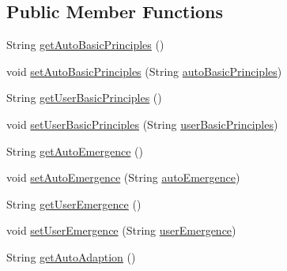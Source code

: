 \subsection*{Public Member Functions}
\begin{DoxyCompactItemize}
\item 
String \hyperlink{classit_1_1isislab_1_1masonassisteddocumentation_1_1_o_d_d_1_1_design_concepts_ad75bf46cbf179f05163ee5910a8266f4}{get\-Auto\-Basic\-Principles} ()
\item 
void \hyperlink{classit_1_1isislab_1_1masonassisteddocumentation_1_1_o_d_d_1_1_design_concepts_a2ad4783ae2e791424ebc7760db127522}{set\-Auto\-Basic\-Principles} (String \hyperlink{classit_1_1isislab_1_1masonassisteddocumentation_1_1_o_d_d_1_1_design_concepts_a79342d4cc10a83a36362ddb68ba842ad}{auto\-Basic\-Principles})
\item 
String \hyperlink{classit_1_1isislab_1_1masonassisteddocumentation_1_1_o_d_d_1_1_design_concepts_ae659768d4ca7393a7c12437782cdfb08}{get\-User\-Basic\-Principles} ()
\item 
void \hyperlink{classit_1_1isislab_1_1masonassisteddocumentation_1_1_o_d_d_1_1_design_concepts_a43bedaee069c906fde6e2cf4eac55910}{set\-User\-Basic\-Principles} (String \hyperlink{classit_1_1isislab_1_1masonassisteddocumentation_1_1_o_d_d_1_1_design_concepts_a4195aaffe8b22faa06be8ffdefe518df}{user\-Basic\-Principles})
\item 
String \hyperlink{classit_1_1isislab_1_1masonassisteddocumentation_1_1_o_d_d_1_1_design_concepts_ae58f86f22178b1faf7f236ff6f190f92}{get\-Auto\-Emergence} ()
\item 
void \hyperlink{classit_1_1isislab_1_1masonassisteddocumentation_1_1_o_d_d_1_1_design_concepts_a125f34275cee2a7d08168e38dc4c1328}{set\-Auto\-Emergence} (String \hyperlink{classit_1_1isislab_1_1masonassisteddocumentation_1_1_o_d_d_1_1_design_concepts_afb61ea0fea50b70639c635c114cc0f05}{auto\-Emergence})
\item 
String \hyperlink{classit_1_1isislab_1_1masonassisteddocumentation_1_1_o_d_d_1_1_design_concepts_a750ba093a32640363c02c324debc9b30}{get\-User\-Emergence} ()
\item 
void \hyperlink{classit_1_1isislab_1_1masonassisteddocumentation_1_1_o_d_d_1_1_design_concepts_a8ae010d47ba506f208a562dbe06877aa}{set\-User\-Emergence} (String \hyperlink{classit_1_1isislab_1_1masonassisteddocumentation_1_1_o_d_d_1_1_design_concepts_a7adfacb24fb2131b673a419372221540}{user\-Emergence})
\item 
String \hyperlink{classit_1_1isislab_1_1masonassisteddocumentation_1_1_o_d_d_1_1_design_concepts_a43b059cadf98d392631539dbc65e2330}{get\-Auto\-Adaption} ()

\end{DoxyCompactItemize}
